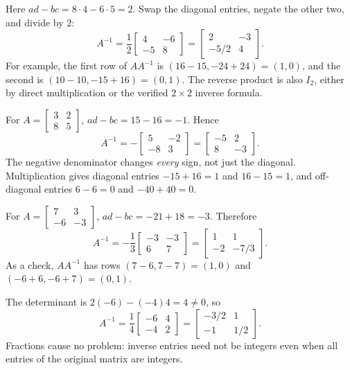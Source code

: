 Here $ad-bc=8\cdot4-6\cdot5=2$. Swap the diagonal entries, negate the
other two, and divide by $2$:
\[
 A^{-1}=\frac12\begin{bmatrix}4&-6\\-5&8\end{bmatrix}
 =\begin{bmatrix}2&-3\\-5/2&4\end{bmatrix}.
\]
For example, the first row of $AA^{-1}$ is
$(16-15,-24+24)=(1,0)$, and the second is $(10-10,-15+16)=(0,1)$.
The reverse product is also $I_2$, either by direct multiplication or the
verified $2\times2$ inverse formula.

For $A=\begin{bmatrix}3&2\\8&5\end{bmatrix}$,
$ad-bc=15-16=-1$. Hence
\[
 A^{-1}=-\begin{bmatrix}5&-2\\-8&3\end{bmatrix}
 =\begin{bmatrix}-5&2\\8&-3\end{bmatrix}.
\]
The negative denominator changes \emph{every} sign, not just the diagonal.
Multiplication gives diagonal entries $-15+16=1$ and $16-15=1$,
and off-diagonal entries $6-6=0$ and $-40+40=0$.

For $A=\begin{bmatrix}7&3\\-6&-3\end{bmatrix}$,
$ad-bc=-21+18=-3$. Therefore
\[
 A^{-1}=-\frac13\begin{bmatrix}-3&-3\\6&7\end{bmatrix}
 =\begin{bmatrix}1&1\\-2&-7/3\end{bmatrix}.
\]
As a check, $AA^{-1}$ has rows $(7-6,7-7)=(1,0)$ and
$(-6+6,-6+7)=(0,1)$.

The determinant is $2(-6)-(-4)4=4\ne0$, so
\[
 A^{-1}=\frac14\begin{bmatrix}-6&4\\-4&2\end{bmatrix}
 =\begin{bmatrix}-3/2&1\\-1&1/2\end{bmatrix}.
\]
Fractions cause no problem: inverse entries need not be integers even when
all entries of the original matrix are integers.

